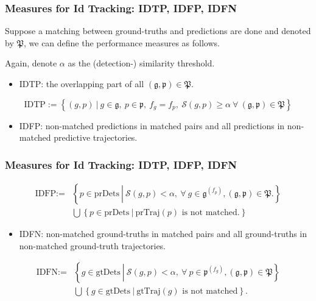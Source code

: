 \documentclass[slidetop, mathserif]{beamer}
\begin{document}
\begin{frame}
	\frametitle{Measures for Id Tracking: IDTP, IDFP, IDFN}
	
	Suppose a matching between ground-truths and predictions are done and denoted by $\mathfrak P$,
	we can define the performance measures as follows.
	
	\vspace{4pt}
	
	Again, denote $\alpha$ as the (detection-) similarity threshold.
	\begin{itemize}
		\item IDTP:
		      the overlapping part of all $(\mathfrak g, \mathfrak p) \in \mathfrak P$.
	\end{itemize}
	
	\vspace{-15pt}
	\[
		\text{IDTP} := \left\{ (g,p)\ |\ 
		g\in\mathfrak g, ~ p\in\mathfrak p, ~
		f_g=f_p, ~ 
		\mathcal S(g,p) \geq \alpha\ 
		\forall\ (\mathfrak g, \mathfrak p)\in\mathfrak P
		\right\}
	\]
	\vspace{-10pt}
	\begin{itemize}
		\item IDFP:
		      non-matched predictions in matched pairs
		      and all predictions in non-matched predictive trajectories.
	\end{itemize}
	    
\end{frame}

\begin{frame}
	\frametitle{Measures for Id Tracking: IDTP, IDFP, IDFN}
	    
	\begin{align*}
		\text{IDFP} := & \left\{ p\in\text{prDets}\ \left|\                                                
		\mathcal S(g,p)<\alpha, \ 
		\forall\ g\in\mathfrak g^{(f_p)},
		(\mathfrak g,\mathfrak p)\in\mathfrak P.
		\right.
		\right\} \\
		               & \bigcup \left\{p \in \text{prDets}\ |\ \text{prTraj$(p)$ is not matched.}\right\} 
	\end{align*}
	
	\vspace{-10pt}
	\begin{itemize}
		\item IDFN:
		      non-matched ground-truths in matched pairs and
		      all ground-truths in non-matched ground-truth trajectories.
	\end{itemize}
	\begin{align*}
		\text{IDFN} := & \left\{ g\in\text{gtDets}\ \left|\                                                
		\mathcal S(g,p)<\alpha, \ 
		\forall\ p\in\mathfrak p^{(f_g)},
		(\mathfrak g,\mathfrak p)\in\mathfrak P
		\right.
		\right\} \\
		               & \bigcup \left\{g \in \text{gtDets}\ |\ \text{gtTraj$(g)$ is not matched}\right\}. 
	\end{align*}
\end{frame}
\end{document}
